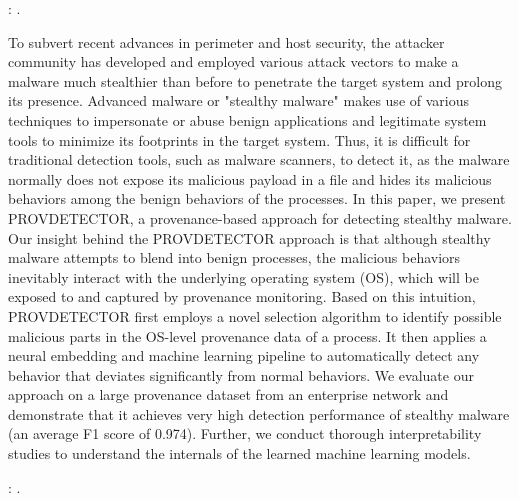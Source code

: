 \documentclass{article}
\begin{document}
\textbf{}: \textcite{Wang:2020}.

To subvert recent advances in perimeter and host security, the attacker community has developed and employed various attack vectors to make a malware much stealthier than before to penetrate the target system and prolong its presence. Advanced malware or "stealthy malware" makes use of various techniques to impersonate or abuse benign applications and legitimate system tools to minimize its footprints in the target system. Thus, it is difficult for traditional detection tools, such as malware scanners, to detect it, as the malware normally does not expose its malicious payload in a file and hides its malicious behaviors among the benign behaviors of the processes. In this paper, we present PROVDETECTOR, a provenance-based approach for detecting stealthy malware. Our insight behind the PROVDETECTOR approach is that although stealthy malware attempts to blend into benign processes, the malicious behaviors inevitably interact with the underlying operating system (OS), which will be exposed to and captured by provenance monitoring. Based on this intuition, PROVDETECTOR first employs a novel selection algorithm to identify possible malicious parts in the OS-level provenance data of a process. It then applies a neural embedding and machine learning pipeline to automatically detect any behavior that deviates significantly from normal behaviors. We evaluate our approach on a large provenance dataset from an enterprise network and demonstrate that it achieves very high detection performance of stealthy malware (an average F1 score of 0.974). Further, we conduct thorough interpretability studies to understand the internals of the learned machine learning models.

\textbf{}: \textcite{Liu:2023}.
\end{document}
